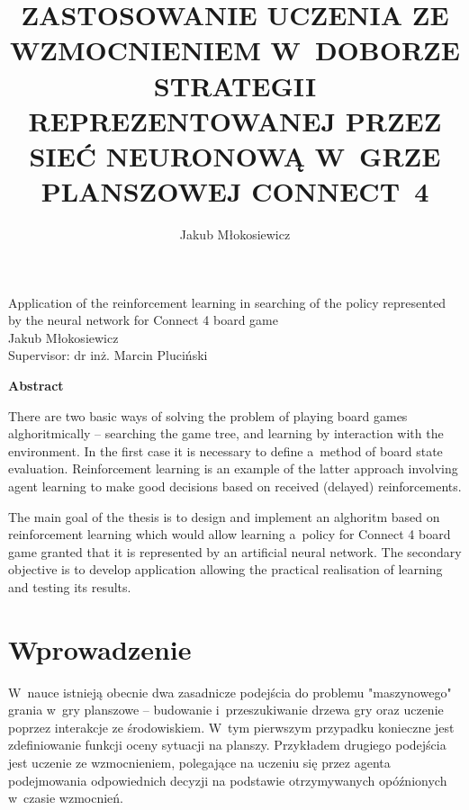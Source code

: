 \documentclass[a4paper, 12pt, oneside]{report}
\title{\MakeUppercase{Zastosowanie uczenia ze wzmocnieniem w~doborze strategii reprezentowanej przez sieć neuronową w~grze planszowej Connect~4}}
\author{Jakub Młokosiewicz}
\begin{document}
\thispagestyle{empty}
{\sffamily \stronatytulowa }

\begin{titlepage}

\begin{center}
\vspace{2.cm}                   
\LARGE Application of the reinforcement learning in searching of the policy 
represented by the neural network for Connect 4 board game \\ 
\vspace{1cm}
\large Jakub Młokosiewicz\\
\large Supervisor: dr inż. Marcin Pluciński\\
\vspace{1cm}
\end{center}

\textbf{Abstract}
\vspace{12pt}

There are two basic ways of solving the problem of playing board games alghoritmically -- searching the game tree, and learning by interaction with the environment. In the first case it is necessary to define a~method of board state evaluation. Reinforcement learning is an example of the latter approach involving agent learning to make good decisions based on received (delayed) reinforcements.

The main goal of the thesis is to design and implement an alghoritm based on reinforcement learning which would allow learning a~policy for Connect 4 board game granted that it is represented by an artificial neural network. The secondary objective is to develop application allowing the practical realisation of learning and testing its results.

\end{titlepage}

\pagebreak

{\sffamily }

\tableofcontents
\listoftables
{}
\listoffigures
{}

\chapter{Wprowadzenie}
 
 W~nauce istnieją obecnie dwa zasadnicze podejścia do problemu "maszynowego" grania w~gry planszowe -- budowanie i~przeszukiwanie drzewa gry oraz uczenie poprzez interakcje ze środowiskiem. W~tym pierwszym przypadku konieczne jest zdefiniowanie funkcji oceny sytuacji na planszy. Przykładem drugiego podejścia jest uczenie ze wzmocnieniem, polegające na uczeniu się przez agenta podejmowania odpowiednich decyzji na podstawie otrzymywanych opóźnionych w~czasie wzmocnień.
\end{document}
